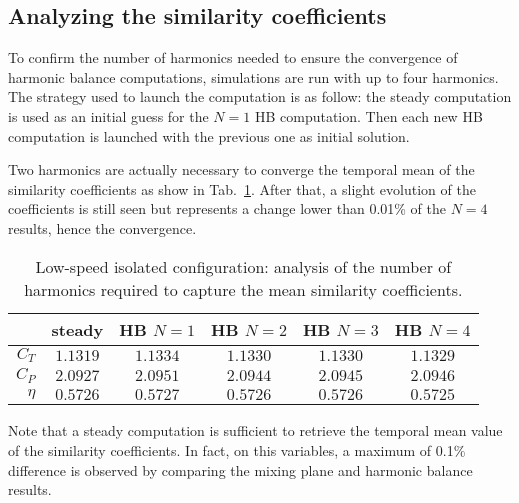 \subsection{Analyzing the similarity coefficients}
\label{sub:dream_ls_conv_hb_sim_coeff}
To confirm the number of harmonics needed to ensure the convergence
of harmonic balance computations, simulations are run with up to four
harmonics. The strategy used to launch the computation is as follow:
the steady computation is used as an initial guess for the $N=1$ HB computation.
Then each new HB computation is launched with the previous one as initial
solution.

Two harmonics are actually necessary to converge the temporal mean 
of the similarity coefficients as show 
in Tab.~\ref{tab:dream_ls_hb_conv_sim}. After that, a slight evolution of the
coefficients is still seen but represents a change lower than 0.01\%
of the $N=4$ results, hence the convergence. 
\begin{table}[htp]
   \centering
  \begin{tabular}{rccccc}
    \toprule
    & steady & HB $N=1$ & HB $N=2$ & HB $N=3$ & HB $N=4$ \\
    \midrule
    $C_T$  & $1.1319$ & $1.1334$ & $1.1330$ & $1.1330$ & $1.1329$ \\
    $C_P$  & $2.0927$ & $2.0951$ & $2.0944$ & $2.0945$ & $2.0946$ \\
    $\eta$ & $0.5726$ & $0.5727$ & $0.5726$ & $0.5726$ & $0.5725$ \\
    \bottomrule
  \end{tabular}
  \caption{Low-speed isolated configuration: analysis of the number of harmonics
  required to capture the mean similarity coefficients.}
  \label{tab:dream_ls_hb_conv_sim}
\end{table}
Note that a steady computation is sufficient to retrieve
the temporal mean value of the similarity coefficients.
In fact, on this variables, a maximum of 0.1\% difference is observed by
comparing the mixing plane and harmonic balance results.

